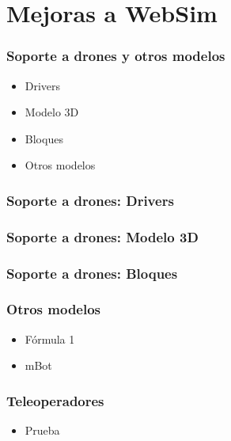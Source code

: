 \documentclass[xcolor={table}]{beamer}
\begin{document}
	\section{Mejoras a WebSim}
		\begin{frame}
			\frametitle{Soporte a drones y otros modelos}
				\begin{itemize}
				\item Drivers
				\item Modelo 3D
				\item Bloques 
				\item Otros modelos 
			\end{itemize}
		\end{frame}
			\begin{frame}
			\frametitle{Soporte a drones: Drivers}
				\begin{itemize}
	
			\end{itemize}
		\end{frame}
    	\begin{frame}
			\frametitle{Soporte a drones: Modelo 3D}
				\begin{itemize}
	
			\end{itemize}
		\end{frame}
		   	\begin{frame}
			\frametitle{Soporte a drones: Bloques}
				\begin{itemize}
	
			\end{itemize}
		\end{frame}
		\begin{frame}
			\frametitle{Otros modelos}
				\begin{itemize}
	            \item Fórmula 1
	            
	            \item mBot
			\end{itemize}
		\end{frame}
			\begin{frame}
			\frametitle{Teleoperadores}
	    		\begin{itemize}
				\item Prueba
			
			\end{itemize}
		\end{frame}
		
\end{document}

